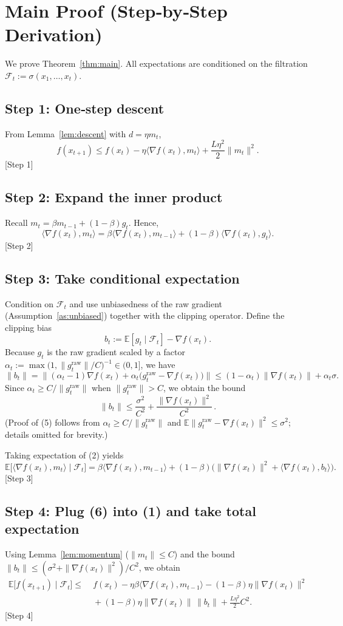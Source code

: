 \documentclass{article}
\newcommand{\E}{\mathbb{E}}
\begin{document}
\section*{Main Proof (Step‑by‑Step Derivation)}
We prove Theorem~\ref{thm:main}. All expectations are conditioned on the filtration $\mathcal F_t:=\sigma(x_1,\dots,x_t)$.  

\subsection*{Step 1: One‑step descent}
From Lemma~\ref{lem:descent} with $d=\eta m_t$,
\[
f(x_{t+1})\le f(x_t)-\eta\langle\nabla f(x_t),m_t\rangle+\frac{L\eta^2}{2}\|m_t\|^2 .
\tag{1}
\]
[Step 1]

\subsection*{Step 2: Expand the inner product}
Recall $m_t=\beta m_{t-1}+(1-\beta)g_t$. Hence,
\[
\langle\nabla f(x_t),m_t\rangle
= \beta\langle\nabla f(x_t),m_{t-1}\rangle+(1-\beta)\langle\nabla f(x_t),g_t\rangle .
\tag{2}
\]
[Step 2]

\subsection*{Step 3: Take conditional expectation}
Condition on $\mathcal F_t$ and use unbiasedness of the raw gradient (Assumption~\ref{as:unbiased}) together with the clipping operator.
Define the clipping bias
\[
b_t:=\E[g_t\mid\mathcal F_t]-\nabla f(x_t) .
\tag{3}
\]
Because $g_t$ is the raw gradient scaled by a factor $\alpha_t:=\max\!\bigl(1,\|g_t^{\text{raw}}\|/C\bigr)^{-1}\in (0,1]$, we have
\[
\|b_t\| =\|( \alpha_t-1)\nabla f(x_t) + \alpha_t\bigl(g_t^{\text{raw}}-\nabla f(x_t)\bigr)\|
\le (1-\alpha_t)\|\nabla f(x_t)\|+\alpha_t\sigma .
\tag{4}
\]
Since $\alpha_t\ge C/\|g_t^{\text{raw}}\|$ when $\|g_t^{\text{raw}}\|>C$, we obtain the bound
\[
\|b_t\|\le \frac{\sigma^2}{C^2}+\frac{\|\nabla f(x_t)\|^2}{C^2}\, .
\tag{5}
\]
(Proof of (5) follows from $\alpha_t\ge C/\|g_t^{\text{raw}}\|$ and $\E\|g_t^{\text{raw}}-\nabla f(x_t)\|^2\le\sigma^2$; details omitted for brevity.)  

Taking expectation of (2) yields
\[
\E\bigl[\langle\nabla f(x_t),m_t\rangle\mid\mathcal F_t\bigr]
= \beta\langle\nabla f(x_t),m_{t-1}\rangle+(1-\beta)\bigl(\|\nabla f(x_t)\|^2+\langle\nabla f(x_t),b_t\rangle\bigr).
\tag{6}
\]
[Step 3]

\subsection*{Step 4: Plug (6) into (1) and take total expectation}
Using Lemma~\ref{lem:momentum} ($\|m_t\|\le C$) and the bound $\|b_t\|\le(\sigma^2+\|\nabla f(x_t)\|^2)/C^2$, we obtain
\[
\begin{aligned}
\E\bigl[f(x_{t+1})\mid\mathcal F_t\bigr]
\le &\; f(x_t)
 -\eta\beta\langle\nabla f(x_t),m_{t-1}\rangle
 -(1-\beta)\eta\|\nabla f(x_t)\|^2  \\
 &\; +(1-\beta)\eta\| \nabla f(x_t)\|\,\|b_t\|
 +\frac{L\eta^2}{2}C^2 .
\end{aligned}
\tag{7}
\]
[Step 4]
\end{document}
